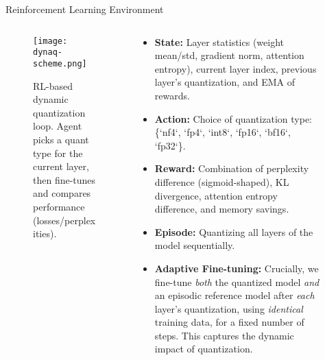 \documentclass[final]{beamer}
\newlength{\sepwidth}
\newlength{\colwidth}
\newcommand{\separatorcolumn}{\begin{column}{\sepwidth}\end{column}}
\begin{document}
\begin{frame}[t]
\begin{columns}[t]
\begin{column}{\colwidth}
				\begin{block}{Reinforcement Learning Environment}
					\begin{columns}[T]
						\begin{column}{0.6\linewidth}
							\begin{figure}[ht]
								\centering
								\texttt{[image: dynaq-scheme.png]}
								\caption{RL-based dynamic quantization loop. Agent picks a quant type for the current layer, then fine-tunes and compares performance (losses/perplexities).}
							\end{figure}
						\end{column}
						\begin{column}{0.4\linewidth}
							\begin{itemize}
								\item \textbf{State:} Layer statistics (weight mean/std, gradient norm, attention entropy), current layer index, previous layer's quantization, and EMA of rewards.
								\item \textbf{Action:} Choice of quantization type: \{`nf4`, `fp4`, `int8`, `fp16`, `bf16`, `fp32`\}.
								\item \textbf{Reward:} Combination of perplexity difference (sigmoid-shaped), KL divergence, attention entropy difference, and memory savings.
								\item \textbf{Episode:} Quantizing all layers of the model sequentially.
								\item \textbf{Adaptive Fine-tuning:} Crucially, we fine-tune \emph{both} the quantized model \emph{and} an episodic reference model after \emph{each} layer's quantization, using \emph{identical} training data, for a fixed number of steps. This captures the dynamic impact of quantization.
							\end{itemize}
						\end{column}
					\end{columns}
				\end{block}
				
			\end{column}
			
			\separatorcolumn
			
			\begin{column}{\colwidth}
				

\end{column}
\end{columns}
\end{frame}
\end{document}
